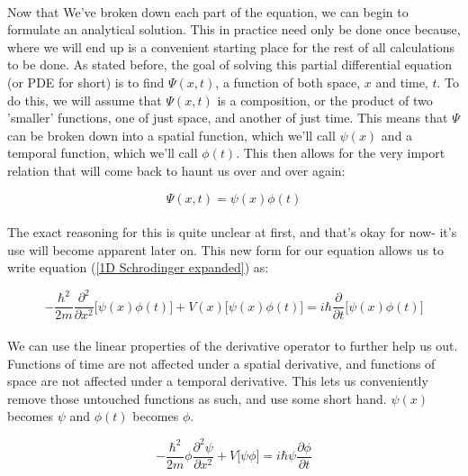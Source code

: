 \documentclass[12pt,letterpaper]{book}
\begin{document}
\paragraph*{}Now that We've broken down each part of the equation, we can begin to formulate an analytical solution. This in practice need only be done once because, where we will end up is a convenient starting place for the rest of all calculations to be done. As stated before, the goal of solving this partial differential equation (or PDE for short) is to find $\Psi(x,t)$, a function of both space, $x$ and time, $t$. To do this, we will assume that $\Psi(x,t)$ is a composition, or the product of two 'smaller' functions, one of just space, and another of just time. This means that $\Psi$ can be broken down into a spatial function, which we'll call $\psi(x)$ and a temporal function, which we'll call $\phi(t)$. This then allows for the very import relation that will come back to haunt us over and over again:

\begin{equation}
\label{separable}
\Psi(x,t) = \psi(x)\phi(t)
\end{equation}

\paragraph*{}The exact reasoning for this is quite unclear at first, and that's okay for now- it's use will become apparent later on. This new form for our equation allows us to write equation (\ref{1D Schrodinger expanded}) as:

\begin{equation}
\label{separated TDSE 0}
-\frac{\hbar^2}{2m}\frac{\partial^2}{\partial x^2}\Big[ \psi(x)\phi(t) \Big] +
V(x)\Big[ \psi(x)\phi(t) \Big] = i\hbar\frac{\partial}{\partial t}\Big[ \psi(x)\phi(t) \Big]
\end{equation}

\paragraph*{}We can use the linear properties of the derivative operator to further help us out. Functions of time are not affected under a spatial derivative, and functions of space are not affected under a temporal derivative. This lets us conveniently remove those untouched functions as such, and use some short hand. $\psi(x)$ becomes $\psi$ and $\phi(t)$ becomes $\phi$.

\begin{equation}
\label{separated TDSE 1}
-\frac{\hbar^2}{2m}\phi\frac{\partial^2\psi}{\partial x^2} +
V\big[ \psi\phi \big] = 
i\hbar\psi\frac{\partial \phi}{\partial t}
\end{equation}
\end{document}
